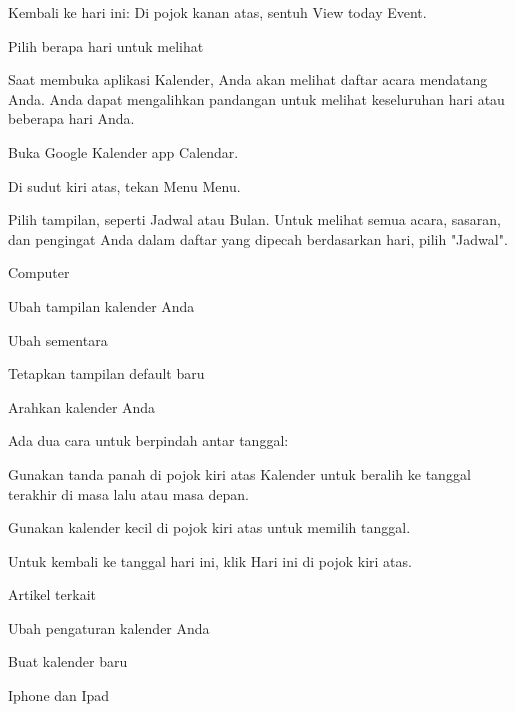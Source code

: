 \noindent 
Kembali ke hari ini: Di pojok kanan atas, sentuh View today Event. \par
\vspace{12pt}
\noindent 
Pilih berapa hari untuk melihat \par
\noindent 
Saat membuka aplikasi Kalender, Anda akan melihat daftar acara mendatang Anda. Anda dapat mengalihkan pandangan untuk melihat keseluruhan hari atau beberapa hari Anda. \par
\vspace{12pt}
\noindent 
Buka Google Kalender app Calendar. \par
\noindent 
Di sudut kiri atas, tekan Menu Menu. \par
\noindent 
Pilih tampilan, seperti Jadwal atau Bulan. Untuk melihat semua acara, sasaran, dan pengingat Anda dalam daftar yang dipecah berdasarkan hari, pilih "Jadwal". \par
\vspace{12pt}
\vspace{12pt}
\noindent 
 \hspace*{0.5in} {\fontsize{16pt}{16pt}\selectfont Computer \\} \par
\vspace{12pt}
\noindent 
Ubah tampilan kalender Anda \par
\noindent 
Ubah sementara \par
\noindent 
Tetapkan tampilan default baru \par
\noindent 
Arahkan kalender Anda \par
\noindent 
Ada dua cara untuk berpindah antar tanggal: \par
\vspace{12pt}
\noindent 
Gunakan tanda panah di pojok kiri atas Kalender untuk beralih ke tanggal terakhir di masa lalu atau masa depan. \par
\noindent 
Gunakan kalender kecil di pojok kiri atas untuk memilih tanggal. \par
\noindent 
Untuk kembali ke tanggal hari ini, klik Hari ini di pojok kiri atas. \par
\vspace{12pt}
\noindent 
Artikel terkait \par
\noindent 
Ubah pengaturan kalender Anda \par
\noindent 
Buat kalender baru \par
\vspace{12pt}
\vspace{12pt}
\noindent 
 \hspace*{0.5in} {\fontsize{16pt}{16pt}\selectfont Iphone dan Ipad \\} \par
